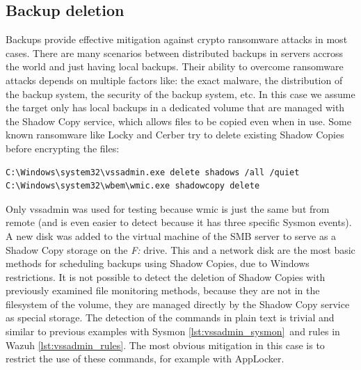 \subsection{Backup deletion}
Backups provide effective mitigation against crypto ransomware attacks in most cases.
There are many scenarios between distributed backups in servers accross the world and just having local backups.
Their ability to overcome ransomware attacks depends on multiple factors like: the exact malware, the distribution of the backup system, the security of the backup system, etc.
\linej
In this case we assume the target only has local backups in a dedicated volume that are managed with the Shadow Copy service, which allows files to be copied even when in use.
Some known ransomware like Locky and Cerber try to delete existing Shadow Copies before encrypting the files\cite{ransomware_oReilly}:
\begin{lstlisting}[style=PS]
C:\Windows\system32\vssadmin.exe delete shadows /all /quiet
C:\Windows\system32\wbem\wmic.exe shadowcopy delete
\end{lstlisting}
\linej
Only vssadmin was used for testing because wmic is just the same but from remote (and is even easier to detect because it has three specific Sysmon events).
A new disk was added to the virtual machine of the SMB server to serve as a Shadow Copy storage on the \textit{F:} drive.
This and a network disk are the most basic methods for scheduling backups using Shadow Copies, due to Windows restrictions.
\linej
\linej
It is not possible to detect the deletion of Shadow Copies with previously examined file monitoring methods, because they are not in the filesystem of the volume, they are managed directly by the Shadow Copy service as special storage.
\linej
The detection of the commands in plain text is trivial and similar to previous examples with Sysmon \ref{lst:vssadmin_sysmon}\ and rules in Wazuh \ref{lst:vssadmin_rules}.
\linej
The most obvious mitigation in this case is to restrict the use of these commands, for example with AppLocker.

